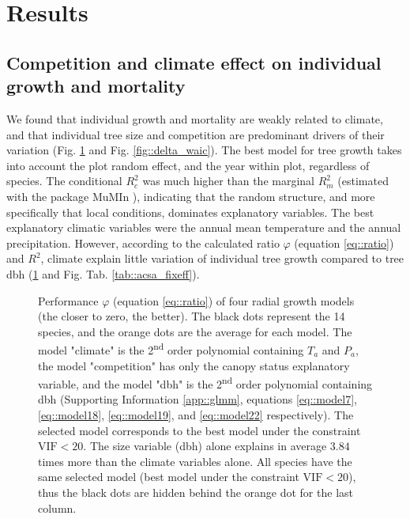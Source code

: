 \section{Results}

\subsection{Competition and climate effect on individual growth and mortality}

We found that individual growth and mortality are weakly related to climate, and that individual tree size and competition are predominant drivers of their variation (Fig. \ref{fig::delta_aic} and Fig. \ref{fig::delta_waic}). The best model for tree growth takes into account the plot random effect, and the year within plot, regardless of species. The conditional $ R_c^2 $ was much higher than the marginal $ R_m^2 $ (estimated with the package MuMIn \citep{MuMIn}), indicating that the random structure, and more specifically that local conditions, dominates explanatory variables. The best explanatory climatic variables were the annual mean temperature and the annual precipitation. However, according to the calculated ratio $ \varphi $ (equation \ref{eq::ratio}) and $ R^2 $, climate explain little variation of individual tree growth compared to tree dbh (\ref{fig::delta_aic} and Fig. Tab. \ref{tab::acsa_fixeff}).

\begin{figure}
	\centering
	
	\caption{Performance $ \varphi $ (equation \ref{eq::ratio}) of four radial growth models (the closer to zero, the better). The black dots represent the 14 species, and the orange dots are the average for each model. The model "climate" is the 2\textsuperscript{nd} order polynomial containing $ T_a $ and $ P_a $, the model "competition" has only the canopy status explanatory variable, and the model "dbh" is the 2\textsuperscript{nd} order polynomial containing dbh (Supporting Information \ref{app::glmm}, equations \eqref{eq::model7}, \eqref{eq::model18}, \eqref{eq::model19}, and \eqref{eq::model22} respectively). The selected model corresponds to the best model under the constraint $ \text{VIF} < 20 $. The size variable (dbh) alone explains in average $ 3.84 $ times more than the climate variables alone. All species have the same selected model (\ie best model under the constraint $ \text{VIF} < 20 $), thus the black dots are hidden behind the orange dot for the last column. \label{fig::delta_aic}}
\end{figure}

